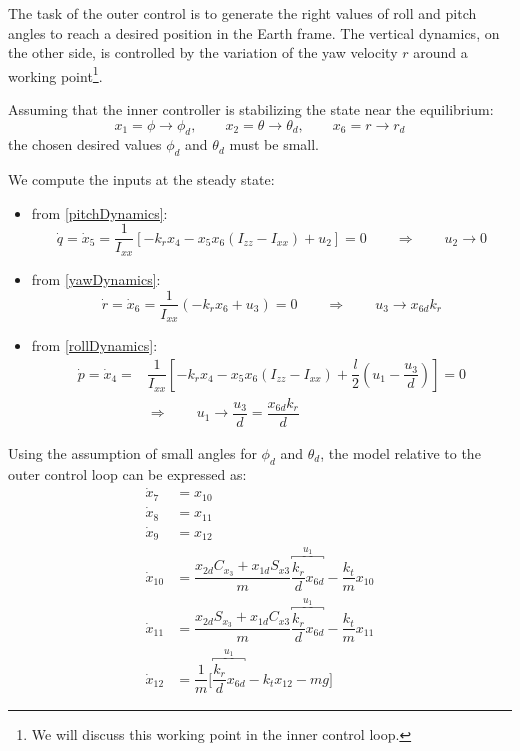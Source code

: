 \documentclass[11pt,a4paper]{scrartcl}
\begin{document}
The task of the outer control is to generate the right values of roll and pitch angles to reach a desired position in the Earth frame. The vertical dynamics, on the other side, is controlled by the variation of the yaw velocity $ r $ around a working point\footnote{We will discuss this working point in the inner control loop.}.

Assuming that the inner controller is stabilizing the state near the equilibrium:
\begin{equation}
	x_1=\phi \rightarrow \phi_d, \qquad x_2=\theta \rightarrow \theta_d, \qquad x_6=r \rightarrow r_d
\end{equation}
the chosen desired values $ \phi_d $ and $ \theta_d $ must be small.

We compute the inputs at the steady state:
\begin{itemize}
	\item from \eqref{pitchDynamics}:
	\begin{equation}
	\dot{q}  = \dot{x}_5 = \dfrac{1}{I_{xx}}[-k_r x_4 - x_5 x_6 (I_{zz} - I_{xx}) + u_2] = 0 \qquad \Rightarrow \qquad u_2 \rightarrow 0 
	\end{equation}
	\item from \eqref{yawDynamics}:
	\begin{equation}
	\dot{r} = \dot{x}_6 = \dfrac{1}{I_{xx}}(-k_r x_6 + u_3) = 0 \qquad \Rightarrow \qquad u_3 \rightarrow x_{6d} k_r
	\end{equation}
	\item from \eqref{rollDynamics}:
	\begin{equation}
	\begin{split}
	\dot{p} = \dot{x}_4 = &\dfrac{1}{I_{xx}}[-k_r x_4 - x_5 x_6 (I_{zz} - I_{xx}) + \dfrac{l}{2} (u_1 -\dfrac{u_3}{d})] = 0 \\ 
	&\Rightarrow \qquad u_1 \rightarrow \dfrac{u_3}{d}= \dfrac{x_{6d} k_r}{d}
	\end{split}
	\end{equation}
\end{itemize}

Using the assumption of small angles for $ \phi_d $ and $ \theta_d $, the model relative to the outer control loop can be expressed as:
\begin{subequations}
	\begin{align}
	\dot{x}_7 & = x_{10} \\
	\dot{x}_8 & = x_{11} \\
	\dot{x}_9 & = x_{12} \\
	\dot{x}_{10} & = \dfrac{ x_{2d} C_{x_3} + x_{1d} S_{x3} }{m} \overbracket{\dfrac{k_r}{d} x_{6d}}^{u_1} -\dfrac{k_t}{m} x_{10} \\
	\dot{x}_{11} & = \dfrac{ x_{2d} S_{x_3} + x_{1d} C_{x3} }{m} \overbracket{\dfrac{k_r}{d} x_{6d}}^{u_1} -\dfrac{k_t}{m} x_{11} \\
	\dot{x}_{12} & = \dfrac{1}{m} \Big[{\overbracket{\dfrac{k_r}{d} x_{6d}}^{u_1}} - k_t x_{12} - mg \Big]
	\end{align}
	\label{outerModel}
\end{subequations}
 
\end{document}
